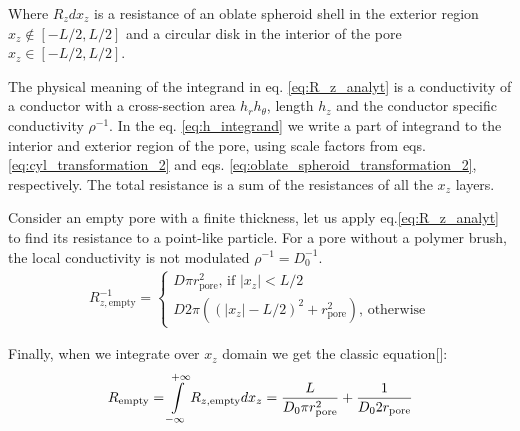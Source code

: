 \documentclass[10pt, a4paper]{article}
\newcommand\todo[1]{\textcolor{red}{#1}}
\begin{document}
\begin{multicols}{2}
Where $R_z d x_z$ is a resistance of an oblate spheroid shell in the exterior region $x_z \notin [-L/2, L/2]$ and a circular disk in the interior of the pore $x_z \in [-L/2, L/2]$. 

The physical meaning of the integrand in eq. \ref{eq:R_z_analyt} is a conductivity of a conductor with a cross-section area $h_r h_{\theta}$, length $h_z$ and the conductor specific conductivity $\rho^{-1}$.
In the eq. \ref{eq:h_integrand} we write a part of integrand to the interior and exterior region of the pore, using scale factors from eqs. \ref{eq:cyl_transformation_2} and eqs. \ref{eq:oblate_spheroid_transformation_2}, respectively.
The total resistance is a sum of the resistances of all the $x_z$ layers.

Consider an empty pore with a finite thickness, let us apply eq.\ref{eq:R_z_analyt} to find its resistance to a point-like particle.
For a pore without a polymer brush, the local conductivity is not modulated $\rho^{-1} = D_0^{-1}$.
\begin{gather}
    \label{eq:r_z_empty}
    R_{z, \textrm{empty}}^{-1} = 
    \begin{cases}
        D \pi r_{\textrm{pore}}^2 \textrm{, if } |x_z| < L/2
        \\
        D 2 \pi ((|x_z|-L/2)^2 + r_{\textrm{pore}}^2) \textrm{, otherwise} 
    \end{cases}
\end{gather}

Finally, when we integrate over $x_z$ domain we get the classic equation[]:
\begin{equation}
    \label{eq:r_empty}
    R_{\textrm{empty}} = \int\displaylimits_{-\infty}^{+\infty} R_{z, \textrm{empty}} dx_z
    =\frac{L}{D_0 \pi r_{\textrm{pore}}^2} + \frac{1}{D_0 2 r_{\textrm{pore}}}
\end{equation}



\end{multicols}
\end{document}
